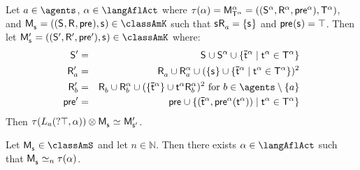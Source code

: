 \begin{lemma}\label{afl-s-construction-learning}
Let $\agentA \in \agents$, $\alpha \in \langAflAct$ where $\tau(\alpha) = \aPModel[\alpha]{\aStatesT[\alpha]} = \aPModelTuple[\alpha]{\aStatesT[\alpha]}$, and $\aPModel{\aStateS} = \aPModelTuple{\aStateS} \in \classAmK$ such that $\aStateS \aAccessibility{\agentA} = \{\aStateS\}$ and $\aPrecondition(\aStateS) = \top$.
Then let $\aPModelP{\aStateS} = \aPModelTupleP{\aStateS} \in \classAmK$ where:
\begin{eqnarray*}
    \aStatesP &=& \aStates \cup \aStates[\alpha] \cup \{\aPStateT[\alpha] \mid \aStateT[\alpha] \in \aStatesT[\alpha]\}\\
    \aAccessibilityP{\agentA} &=& \aAccessibility{\agentA} \cup \aAccessibility[\alpha]{\agentA} \cup (\{\aStateS\} \cup \{\aPStateT[\alpha] \mid \aStateT[\alpha] \in \aStatesT[\alpha]\})^2\\
    \aAccessibilityP{\agentB} &=& \aAccessibility{\agentB} \cup \aAccessibility[\alpha]{\agentB} \cup (\{\aPStateT[\alpha]\} \cup \aStateT[\alpha] \aAccessibility[\alpha]{\agentB})^2 \text{ for } \agentB \in \agents \setminus \{\agentA\}\\
    \aPreconditionP &=& \aPrecondition \cup \{(\aPStateT[\alpha], \aPrecondition[\alpha](\aStateT[\alpha])) \mid \aStateT[\alpha] \in \aStatesT[\alpha]\}
\end{eqnarray*}
Then $\tau(\learns_\agentA (\test{\top}, \alpha)) \exec \aPModel{\aStateS} \bisimilar \aPModelP{\aStateSP}$.
\end{lemma}

\begin{proposition}\label{afl-s-correspondence}
Let $\aPModel{\aStateS} \in \classAmS$ and let $n \in \mathbb{N}$. 
Then there exists $\alpha \in \langAflAct$ such that $\aPModel{\aStateS} \bisimilar[n] \tau(\alpha)$.
\end{proposition}

